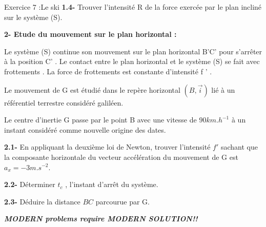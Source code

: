 \documentclass[12pt, french]{article}
\begin{document}
\begin{Box2}{Exercice 7 :Le ski }
\textbf{1.4- }Trouver l’intensité R de la force exercée par le plan incliné sur le système (S).


\textbf{2- Etude du mouvement sur le plan horizontal :}

Le système (S) continue son mouvement sur le plan horizontal B'C' pour s’arrêter à la position
C' . Le contact entre le plan horizontal et le système (S) se fait avec frottements . La force de
frottements est constante d’intensité f ' .

Le mouvement de G est étudié dans le repère horizontal $(B,\vec{i})$ lié à un référentiel terrestre considéré
galiléen.

Le centre d’inertie G passe par le point B avec une vitesse de $90 km.h^{-1}$ à un instant considéré
comme nouvelle origine des dates.

\textbf{2.1- }En appliquant la deuxième loi de Newton, trouver l’intensité $f'$ sachant que la composante
horizontale du vecteur accélération du mouvement de G est $a_x =-3m.s^{-2}$.

\textbf{2.2- }Déterminer $t_c$ , l’instant d’arrêt du système.

\textbf{2.3- }Déduire la distance $BC$ parcourue par G.
\end{Box2}
\begin{center} \emph{\textbf{MODERN problems require MODERN SOLUTION!!}}
\end{center}











\end{document}
